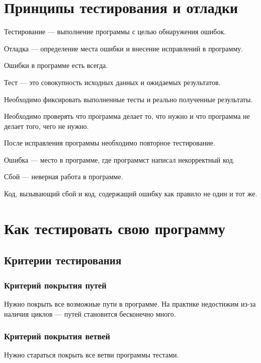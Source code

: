 \documentclass[14pt,openany]{book}
\begin{document}
\begingroup
\hypersetup{linkcolor=black}
\tableofcontents
\endgroup

\clearpage

\chapter{Принципы тестирования и отладки}

Тестирование --- выполнение программы с целью обнаружения ошибок.

Отладка --- определение места ошибки и внесение исправлений в программу.

Ошибки в программе есть всегда.

Тест --- это совокупность исходных данных и ожидаемых результатов.

Необходимо фиксировать выполненные тесты и реально полученные результаты.

Необходимо проверять что программа делает то, что нужно и что программа
не делает того, чего не нужно.

После исправления программы необходимо повторное тестирование.

Ошибка --- место в программе, где программст написал некорректный код.

Сбой --- неверная работа в программе.

Код, вызывающий сбой и код, содержащий ошибку как правило не один и тот же.

\chapter{Как тестировать свою программу}

\section{Критерии тестирования}

\subsection{Критерий покрытия путей}

Нужно покрыть все возможные пути в программе. На практике
недостижим из-за наличия циклов --- путей становится бесконечно много.

\subsection{Критерий покрытия ветвей}

Нужно стараться покрыть все ветви программы тестами.
\end{document}
